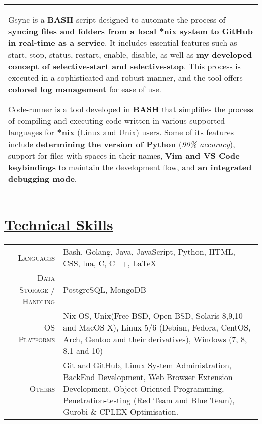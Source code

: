 \documentclass[a4paper,10pt]{extarticle} %
\begin{document}
\begin{tabular}{p{19.7cm}}
\begin{description}[style=nextline, font=$\bullet$\hspace{2mm}\normalsize]
 \item[{\href{https://github.com/proffapt/gsync}{GSYNC}}] 
Gsync is a \textbf{BASH} script designed to automate the process of \textbf{syncing files and folders from a local *nix system to GitHub in real-time as a service}. It includes essential features such as start, stop, status, restart, enable, disable, as well as \textbf{my developed concept of selective-start and selective-stop}. This process is executed in a sophisticated and robust manner, and the tool offers \textbf{colored log management} for ease of use.
 
 \item[{\href{https://github.com/proffapt/code-runner}{Code Runner}}] 
Code-runner is a tool developed in \textbf{BASH} that simplifies the process of compiling and executing code written in various supported languages for \textbf{*nix} (Linux and Unix) users. Some of its features include \textbf{determining the version of Python} (\textit{90\% accuracy}), support for files with spaces in their names, \textbf{Vim and VS Code keybindings} to maintain the development flow, and \textbf{an integrated debugging mode}.

 
\end{description}
\end{tabular}

 \vspace{-0.3cm}
 \section{\textcolor{primary}{\href{https://www.github.com/proffapt/bodhitree}{Technical Skills}}}

 \vspace{+0.1cm}

 \begin{tabular}{r|p{15cm}}
 \textsc{Languages} & Bash, Golang, Java, JavaScript, Python, HTML, CSS, lua, C, C++, LaTeX\\
 \textsc{Data Storage / Handling} & PostgreSQL, MongoDB \\
 \textsc{OS Platforms} & Nix OS, Unix(Free BSD, Open BSD, Solaris-8,9,10 and MacOS X), Linux 5/6 (Debian, Fedora, CentOS, Arch, Gentoo and their derivatives), Windows (7, 8, 8.1 and 10) \\
 \textsc{Others} & Git and GitHub, Linux System Administration, BackEnd Development, Web Browser Extension Development, Object Oriented Programming, Penetration-testing (Red Team and Blue Team), Gurobi \& CPLEX Optimisation.  \\
\end{tabular}
\end{document}
